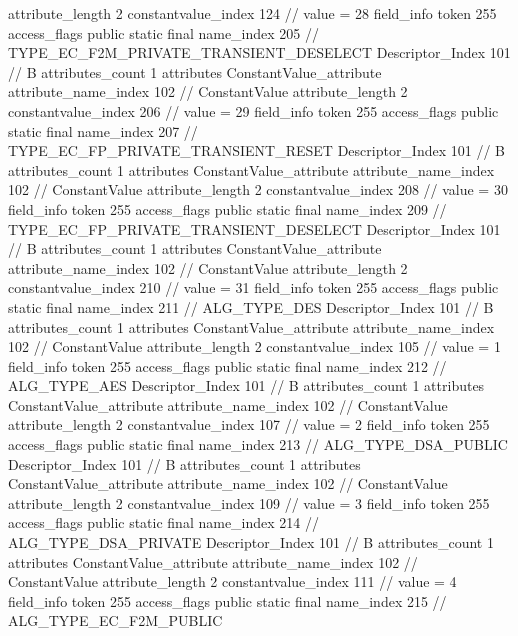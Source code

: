 {{{{{{{					attribute_length	2
					constantvalue_index	124		// value = 28
				}
				}
			}
			field_info {
				token	255
				access_flags	public static final
				name_index	205		// TYPE_EC_F2M_PRIVATE_TRANSIENT_DESELECT
				Descriptor_Index	101		// B
				attributes_count	1
				attributes {
				ConstantValue_attribute {
					attribute_name_index	102		// ConstantValue
					attribute_length	2
					constantvalue_index	206		// value = 29
				}
				}
			}
			field_info {
				token	255
				access_flags	public static final
				name_index	207		// TYPE_EC_FP_PRIVATE_TRANSIENT_RESET
				Descriptor_Index	101		// B
				attributes_count	1
				attributes {
				ConstantValue_attribute {
					attribute_name_index	102		// ConstantValue
					attribute_length	2
					constantvalue_index	208		// value = 30
				}
				}
			}
			field_info {
				token	255
				access_flags	public static final
				name_index	209		// TYPE_EC_FP_PRIVATE_TRANSIENT_DESELECT
				Descriptor_Index	101		// B
				attributes_count	1
				attributes {
				ConstantValue_attribute {
					attribute_name_index	102		// ConstantValue
					attribute_length	2
					constantvalue_index	210		// value = 31
				}
				}
			}
			field_info {
				token	255
				access_flags	public static final
				name_index	211		// ALG_TYPE_DES
				Descriptor_Index	101		// B
				attributes_count	1
				attributes {
				ConstantValue_attribute {
					attribute_name_index	102		// ConstantValue
					attribute_length	2
					constantvalue_index	105		// value = 1
				}
				}
			}
			field_info {
				token	255
				access_flags	public static final
				name_index	212		// ALG_TYPE_AES
				Descriptor_Index	101		// B
				attributes_count	1
				attributes {
				ConstantValue_attribute {
					attribute_name_index	102		// ConstantValue
					attribute_length	2
					constantvalue_index	107		// value = 2
				}
				}
			}
			field_info {
				token	255
				access_flags	public static final
				name_index	213		// ALG_TYPE_DSA_PUBLIC
				Descriptor_Index	101		// B
				attributes_count	1
				attributes {
				ConstantValue_attribute {
					attribute_name_index	102		// ConstantValue
					attribute_length	2
					constantvalue_index	109		// value = 3
				}
				}
			}
			field_info {
				token	255
				access_flags	public static final
				name_index	214		// ALG_TYPE_DSA_PRIVATE
				Descriptor_Index	101		// B
				attributes_count	1
				attributes {
				ConstantValue_attribute {
					attribute_name_index	102		// ConstantValue
					attribute_length	2
					constantvalue_index	111		// value = 4
				}
				}
			}
			field_info {
				token	255
				access_flags	public static final
				name_index	215		// ALG_TYPE_EC_F2M_PUBLIC
}}}}}
